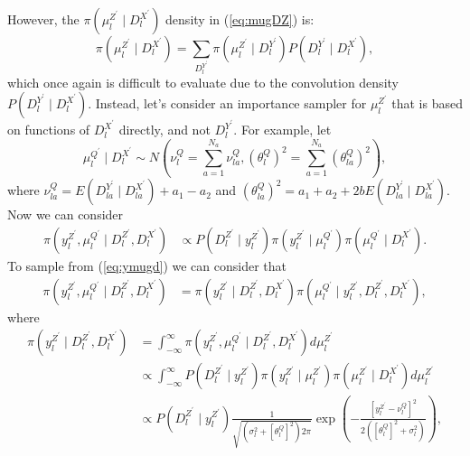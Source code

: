 \documentclass[a4paper]{article}
\begin{document}
However, the $\pi\left(\mu^{Z^\prime}_l \mid D^{X^\prime}_l\right)$ density in (\ref{eq:mugDZ}) is:
\begin{equation*}
    \pi\left(\mu^{Z^\prime}_l \mid D^{X^\prime}_l\right) = \sum_{D^{Y^\prime}_l} \pi\left(\mu^{Z^\prime}_l \mid D^{Y^\prime}_l\right)P\left(D^{Y^\prime}_l \mid D^{X^\prime}_l\right),
\end{equation*}
which once again is difficult to evaluate due to the convolution density $P\left(D^{Y^\prime}_l \mid D^{X^\prime}_l\right)$. Instead, let's consider an importance sampler for $\mu^{Z^\prime}_l$ that is based on functions of $D^{X^\prime}_l$ directly, and not $D^{Y^\prime}_l$. For example, let
\begin{equation}
    \mu^{Q^\prime}_l \mid D^{X^\prime}_{l} \sim N\left(\nu^Q_l = \sum_{a = 1}^{N_a} \nu^Q_{la} , \left(\theta^Q_l\right)^2 = \sum_{a = 1}^{N_a} \left(\theta^Q_{la}\right)^2\right),
\end{equation}
where $\nu^Q_{la} = E\left(D^{Y^\prime}_{la} \mid D^{X^\prime}_{la}\right) + a_1 - a_2$ and $\left(\theta^Q_{la}\right)^2 = a_1 + a_2 + 2bE\left(D^{Y^\prime}_{la} \mid D^{X^\prime}_{la}\right)$. Now we can consider
\begin{align}
    \pi\left(y^{Z^\prime}_l, \mu^{Q^\prime}_l \mid D^{Z^\prime}_l, D^{X^\prime}_l\right) &\propto P\left(D^{Z^\prime}_l \mid y^{Z^\prime}_l \right) \pi\left(y^{Z^\prime}_l \mid \mu^{Q^\prime}_l\right)\pi\left(\mu^{Q^\prime}_l \mid D^{X^\prime}_l\right).\label{eq:ymugd}
\end{align}
To sample from (\ref{eq:ymugd}) we can consider that
\begin{align}
    \pi\left(y^{Z^\prime}_l, \mu^{Q^\prime}_l \mid D^{Z^\prime}_l, D^{X^\prime}_l\right) &= \pi\left(y^{Z^\prime}_l \mid D^{Z^\prime}_l, D^{X^\prime}_l\right)\pi\left(\mu^{Q^\prime}_l \mid y^{Z^\prime}_l, D^{Z^\prime}_l, D^{X^\prime}_l\right)\nonumber,
\end{align}
where 
\begin{align}
    \pi\left(y^{Z^\prime}_l \mid D^{Z^\prime}_l, D^{X^\prime}_l\right) &= \int_{-\infty}^\infty \pi\left(y^{Z^\prime}_l, \mu^{Q^\prime}_l \mid D^{Z^\prime}_l, D^{X^\prime}_l\right) d\mu^{Z^\prime}_l\nonumber\\
    &\propto \int_{-\infty}^\infty P\left(D^{Z^\prime}_l \mid y^{Z^\prime}_l\right)\pi\left(y^{Z^\prime}_l \mid \mu^{Z^\prime}_l\right)\pi\left(\mu^{Z^\prime}_l \mid D^{X^\prime}_l\right)d\mu^{Z^\prime}_l \nonumber\\
    &\propto P\left(D^{Z^\prime}_l \mid y^{Z^\prime}_l\right)\frac{1}{\sqrt{\left(\sigma^2_l + \left[\theta^Q_l\right]^2\right)2\pi}} \exp\left(-\frac{\left[y^{Z^\prime}_l - \nu^Q_l\right]^2}{2\left(\left[\theta^Q_l\right]^2 + \sigma^2_l\right)}\right),
\end{align}
\end{document}

